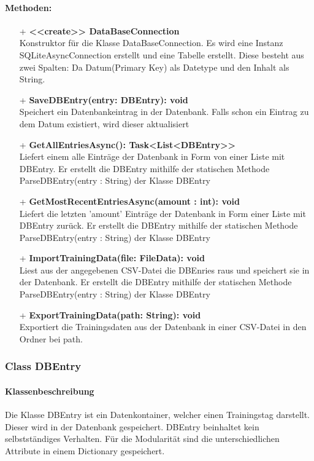 \documentclass[a4paper,12pt]{article}
\begin{document}
	\paragraph{Methoden:}
	\begin{itemize}
		\item[+] \textbf{<<create>> DataBaseConnection}\\Konstruktor für die Klasse DataBaseConnection. Es wird eine Instanz SQLiteAsyncConnection erstellt und eine Tabelle erstellt. Diese besteht aus zwei Spalten: Da Datum(Primary Key) als Datetype und den Inhalt als String.
		\item[+] \textbf{SaveDBEntry(entry: DBEntry): void}\\Speichert ein Datenbankeintrag in der \gls{Datenbank}. Falls schon ein Eintrag zu dem Datum existiert, wird dieser aktualisiert\\
		\item[+] \textbf{GetAllEntriesAsync(): Task<List<DBEntry>>}\\Liefert einem alle Einträge der Datenbank in Form von einer Liste mit DBEntry. Er erstellt die DBEntry mithilfe der statischen Methode ParseDBEntry(entry : String) der Klasse DBEntry\\ 
		\item[+] \textbf{GetMostRecentEntriesAsync(amount : int): void}\\Liefert  die letzten 'amount' Einträge der Datenbank in Form einer Liste mit DBEntry zurück. Er erstellt die DBEntry mithilfe der statischen Methode ParseDBEntry(entry : String) der Klasse DBEntry\\
		\item[+] \textbf{ImportTrainingData(file: FileData): void}\\Liest aus der angegebenen \gls{CSV}-Datei die DBEnries raus und speichert sie in der \gls{Datenbank}. Er erstellt die DBEntry mithilfe der statischen Methode ParseDBEntry(entry : String) der Klasse DBEntry\\
		\item[+] \textbf{ExportTrainingData(path: String): void}\\Exportiert die Trainingsdaten aus der \gls{Datenbank} in einer \gls{CSV}-Datei in den Ordner bei path. \\
	\end{itemize}
\subsubsection{Class DBEntry}
	\paragraph{Klassenbeschreibung}
	Die Klasse DBEntry ist ein Datenkontainer, welcher einen Trainingstag darstellt. Dieser wird in der Datenbank gespeichert. DBEntry beinhaltet kein selbstständiges Verhalten. Für die Modularität sind die unterschiedlichen Attribute in einem Dictionary gespeichert.
	
\end{document}
